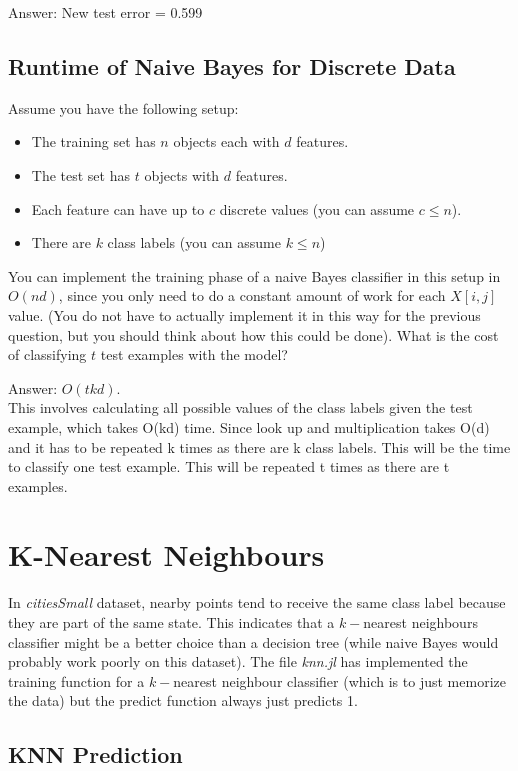 \documentclass{article}
\def\ans#1{\par\gre{Answer: #1}}
\def\blu#1{{\color{blu}#1}}
\def\gre#1{{\color{gre}#1}}
\def\items#1{\begin{itemize}#1\end{itemize}}
\begin{document}
\ans{New test error = 0.599}

\pagebreak

\subsection{Runtime of Naive Bayes for Discrete Data}

Assume you have the following setup:
\items{
\item The training set has $n$ objects each with $d$ features.
\item The test set has $t$ objects with $d$ features.
\item Each feature can have up to $c$ discrete values (you can assume $c \leq n$).
\item There are $k$ class labels (you can assume $k \leq n$)
}
You can implement the training phase of a naive Bayes classifier in this setup in $O(nd)$, since you only need to do a constant amount of work for each $X[i,j]$ value. (You do not have to actually implement it in this way for the previous question, but you should think about how this could be done). \blu{What is the cost of classifying $t$ test examples with the model?}

\ans{$O(tkd)$.
\\
This involves calculating all possible values of the class labels given the test example, which takes O(kd) time. Since look up and multiplication takes O(d) and it has to be repeated k times as there are k class labels. This will be the time to classify one test example. This will be repeated t times as there are t examples.}

\pagebreak

\section{K-Nearest Neighbours}


In \emph{citiesSmall} dataset, nearby points tend to receive the same class label because they are part of the same state. This indicates that a $k-$nearest neighbours classifier might be a better choice than a decision tree (while naive Bayes would probably work poorly on this dataset). The file \emph{knn.jl} has implemented the training function for a $k-$nearest neighbour classifier (which is to just memorize the data) but the predict function always just predicts 1.


\subsection{KNN Prediction}
\end{document}
